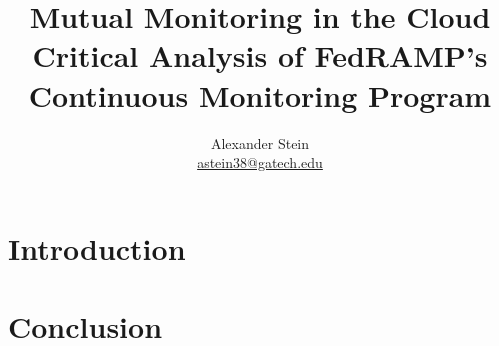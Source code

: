 \documentclass{jdf}
\begin{document}
\title{Mutual Monitoring in the Cloud \\ Critical Analysis of FedRAMP's Continuous Monitoring Program}
\author{Alexander Stein \\ \hyperlink{mailto:astein38@gatech.edu}{astein38@gatech.edu}}

\maketitle
\thispagestyle{fancy}

\section*{Introduction}

\section*{Conclusion}
\end{document}
